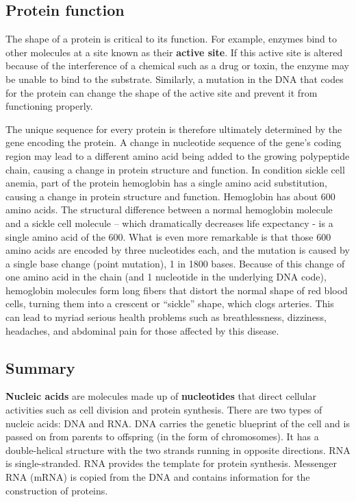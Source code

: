 \documentclass[
]{book}
\begin{document}
\hypertarget{protein-function}{%
\subsection{Protein function}\label{protein-function}}

The shape of a protein is critical to its function. For example, enzymes
bind to other molecules at a site known as their \textbf{active site}. If
this active site is altered because of the interference of a chemical
such as a drug or toxin, the enzyme may be unable to bind to the
substrate. Similarly, a mutation in the DNA that codes for the protein
can change the shape of the active site and prevent it from functioning
properly.

The unique sequence for every protein is therefore ultimately determined
by the gene encoding the protein. A change in nucleotide sequence of the
gene's coding region may lead to a different amino acid being added to
the growing polypeptide chain, causing a change in protein structure and
function. In condition sickle cell anemia, part of the protein
hemoglobin has a single amino acid substitution, causing a change in
protein structure and function. Hemoglobin has about 600 amino acids.
The structural difference between a normal hemoglobin molecule and a
sickle cell molecule -- which dramatically decreases life expectancy -
is a single amino acid of the 600. What is even more remarkable is that
those 600 amino acids are encoded by three nucleotides each, and the
mutation is caused by a single base change (point mutation), 1 in 1800
bases. Because of this change of one amino acid in the chain (and 1
nucleotide in the underlying DNA code), hemoglobin molecules form long
fibers that distort the normal shape of red blood cells, turning them
into a crescent or ``sickle'' shape, which clogs arteries. This can lead
to myriad serious health problems such as breathlessness, dizziness,
headaches, and abdominal pain for those affected by this disease.

\hypertarget{summary-1}{%
\subsection{Summary}\label{summary-1}}

\textbf{Nucleic acids} are molecules made up of \textbf{nucleotides} that direct
cellular activities such as cell division and protein synthesis. There
are two types of nucleic acids: DNA and RNA. DNA carries the genetic
blueprint of the cell and is passed on from parents to offspring (in the
form of chromosomes). It has a double-helical structure with the two
strands running in opposite directions. RNA is single-stranded. RNA
provides the template for protein synthesis. Messenger RNA (mRNA) is
copied from the DNA and contains information for the construction of
proteins.
\end{document}
